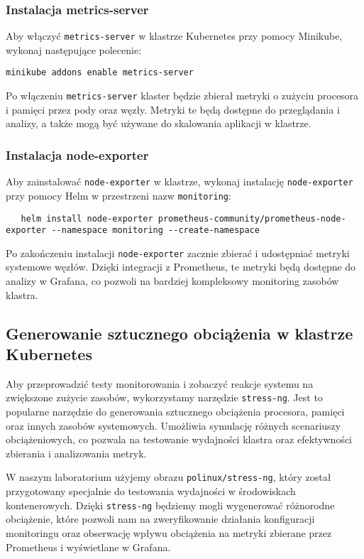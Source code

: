 \documentclass{article}
\begin{document}
\subsubsection{Instalacja metrics-server}
Aby włączyć \texttt{metrics-server} w klastrze Kubernetes przy pomocy Minikube, wykonaj następujące polecenie:

\begin{lstlisting}
minikube addons enable metrics-server
\end{lstlisting}

Po włączeniu \texttt{metrics-server} klaster będzie zbierał metryki o zużyciu procesora i pamięci przez pody oraz węzły. Metryki te będą dostępne do przeglądania i analizy, a także mogą być używane do skalowania aplikacji w klastrze.

\subsubsection{Instalacja node-exporter}
Aby zainstalować \texttt{node-exporter} w klastrze, wykonaj instalację \texttt{node-exporter} przy pomocy Helm w przestrzeni nazw \texttt{monitoring}:
   \begin{lstlisting}
   helm install node-exporter prometheus-community/prometheus-node-exporter --namespace monitoring --create-namespace
   \end{lstlisting}

Po zakończeniu instalacji \texttt{node-exporter} zacznie zbierać i udostępniać metryki systemowe węzłów. Dzięki integracji z Prometheus, te metryki będą dostępne do analizy w Grafana, co pozwoli na bardziej kompleksowy monitoring zasobów klastra.

\subsection{Generowanie sztucznego obciążenia w klastrze Kubernetes}

Aby przeprowadzić testy monitorowania i zobaczyć reakcje systemu na zwiększone zużycie zasobów, wykorzystamy narzędzie \texttt{stress-ng}. Jest to popularne narzędzie do generowania sztucznego obciążenia procesora, pamięci oraz innych zasobów systemowych. Umożliwia symulację różnych scenariuszy obciążeniowych, co pozwala na testowanie wydajności klastra oraz efektywności zbierania i analizowania metryk.

W naszym laboratorium użyjemy obrazu \texttt{polinux/stress-ng}, który został przygotowany specjalnie do testowania wydajności w środowiskach kontenerowych. Dzięki \texttt{stress-ng} będziemy mogli wygenerować różnorodne obciążenie, które pozwoli nam na zweryfikowanie działania konfiguracji monitoringu oraz obserwację wpływu obciążenia na metryki zbierane przez Prometheus i wyświetlane w Grafana.
\end{document}
